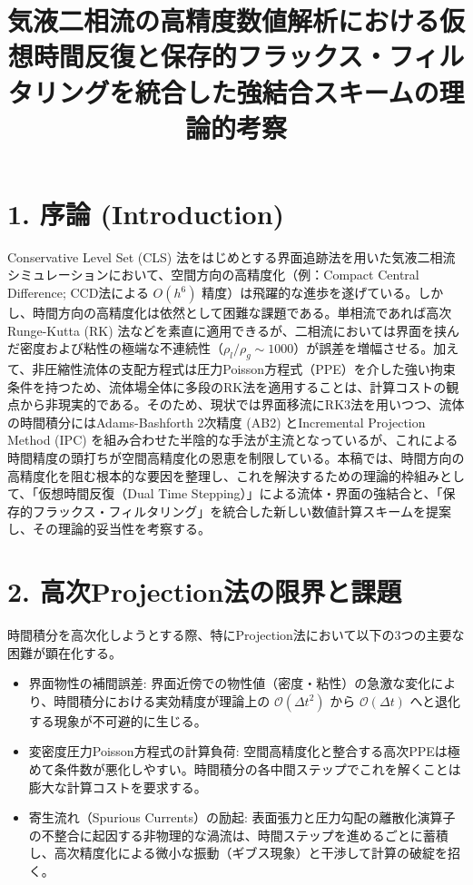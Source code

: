 \documentclass[12pt, a4paper, titlepage]{article}
\title{気液二相流の高精度数値解析における仮想時間反復と保存的フラックス・フィルタリングを統合した強結合スキームの理論的考察}
\author{}
\date{}
\begin{document}
\maketitle

\section*{1. 序論 (Introduction)}
Conservative Level Set (CLS) 法をはじめとする界面追跡法を用いた気液二相流シミュレーションにおいて、空間方向の高精度化（例：Compact Central Difference; CCD法による $O(h^6)$ 精度）は飛躍的な進歩を遂げている。しかし、時間方向の高精度化は依然として困難な課題である。単相流であれば高次Runge-Kutta (RK) 法などを素直に適用できるが、二相流においては界面を挟んだ密度および粘性の極端な不連続性（$\rho_l/\rho_g \sim 1000$）が誤差を増幅させる。加えて、非圧縮性流体の支配方程式は圧力Poisson方程式（PPE）を介した強い拘束条件を持つため、流体場全体に多段のRK法を適用することは、計算コストの観点から非現実的である。そのため、現状では界面移流にRK3法を用いつつ、流体の時間積分にはAdams-Bashforth 2次精度 (AB2) とIncremental Projection Method (IPC) を組み合わせた半陰的な手法が主流となっているが、これによる時間精度の頭打ちが空間高精度化の恩恵を制限している。本稿では、時間方向の高精度化を阻む根本的な要因を整理し、これを解決するための理論的枠組みとして、「仮想時間反復（Dual Time Stepping）」による流体・界面の強結合と、「保存的フラックス・フィルタリング」を統合した新しい数値計算スキームを提案し、その理論的妥当性を考察する。

\section*{2. 高次Projection法の限界と課題}
時間積分を高次化しようとする際、特にProjection法において以下の3つの主要な困難が顕在化する。
\begin{itemize}
    \item 界面物性の補間誤差: 界面近傍での物性値（密度・粘性）の急激な変化により、時間積分における実効精度が理論上の $\mathcal{O}(\Delta t^2)$ から $\mathcal{O}(\Delta t)$ へと退化する現象が不可避的に生じる。
    \item 変密度圧力Poisson方程式の計算負荷: 空間高精度化と整合する高次PPEは極めて条件数が悪化しやすい。時間積分の各中間ステップでこれを解くことは膨大な計算コストを要求する。
    \item 寄生流れ（Spurious Currents）の励起: 表面張力と圧力勾配の離散化演算子の不整合に起因する非物理的な渦流は、時間ステップを進めるごとに蓄積し、高次精度化による微小な振動（ギブス現象）と干渉して計算の破綻を招く。
\end{itemize}
\end{document}
